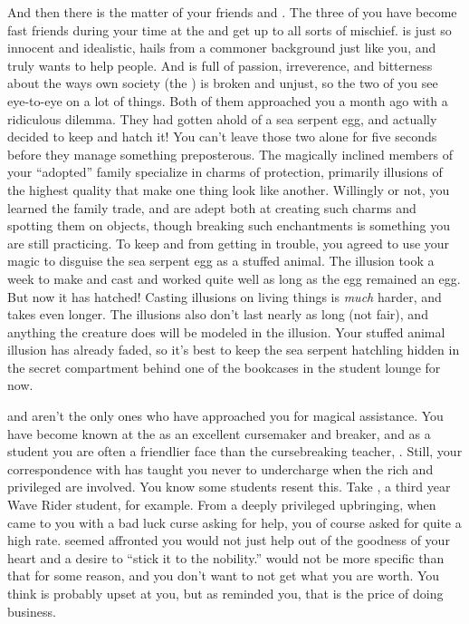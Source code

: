 \documentclass[char]{GL2020}
\begin{document}
And then there is the matter of your friends \cDisney{\full} and \cPirateChild{\full}. The three of you have become fast friends during your time at the \pSchool{} and get up to all sorts of mischief. \cDisney{} is just so innocent and idealistic, hails from a commoner background just like you, and truly wants to help people. And \cPirateChild{} is full of passion, irreverence, and bitterness about the ways \cPirateChild{\their} own society (the \pShip{}) is broken and unjust, so the two of you see eye-to-eye on a lot of things. Both of them approached you a month ago with a ridiculous dilemma. They had gotten ahold of a sea serpent egg, and actually decided to keep and hatch it! You can't leave those two alone for five seconds before they manage something preposterous. The magically inclined members of your ``adopted'' family specialize in charms of protection, primarily illusions of the highest quality that make one thing look like another. Willingly or not, you learned the family trade, and are adept both at creating such charms and spotting them on objects, though breaking such enchantments is something you are still practicing. To keep \cDisney{} and \cPirateChild{} from getting in trouble, you agreed to use your magic to disguise the sea serpent egg as a stuffed animal. The illusion took a week to make and cast and worked quite well as long as the egg remained an egg. But now it has hatched! Casting illusions on living things is \emph{much} harder, and takes even longer. The illusions also don't last nearly as long (not fair), and anything the creature does will be modeled in the illusion. Your stuffed animal illusion has already faded, so it's best to keep the sea serpent hatchling hidden in the secret compartment behind one of the bookcases in the student lounge for now.

\cDisney{} and \cPirateChild{} aren’t the only ones who have approached you for magical assistance. You have become known at the \pSchool{} as an excellent cursemaker and breaker, and as a student you are often a friendlier face than the cursebreaking teacher, \cPrince{}. Still, your correspondence with \cCurse{} has taught you never to undercharge when the rich and privileged are involved. You know some students resent this. Take \cInitiate{\full}, a third year Wave Rider student, for example. From a deeply privileged upbringing, when \cInitiate{\they} came to you with a bad luck curse asking for help, you of course asked for quite a high rate. \cInitiate{} seemed affronted you would not just help \cInitiate{\them} out of the goodness of your heart and a desire to “stick it to the \pFarm{} nobility.” \cInitiate{\They} would not be more specific than that for some reason, and you don’t want to not get what you are worth. You think \cInitiate{\they}is probably upset at you, but as \cLibAssist{} reminded you, that is the price of doing business.   
\end{document}
